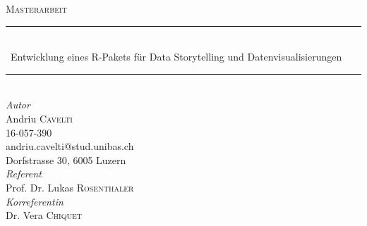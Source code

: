 


	\newcommand{\HRule}{\rule{\linewidth}{0.5mm}} %

	\begin{center}



	\textsc{\Large Masterarbeit}\\[1.5cm] %


	\HRule\\[0.4cm]

	{\huge\ Entwicklung eines R-Pakets für Data Storytelling und Datenvisualisierungen}\\[0.4cm] %

	\HRule\\[1.5cm]


	\large
	  \textit{Autor}\\
	  Andriu \textsc{Cavelti}\\
	  16-057-390\\
	  andriu.cavelti@stud.unibas.ch\\
	  Dorfstrasse 30, 6005 Luzern\\[1.5cm]

	  \textit{Referent}\\
	  Prof. Dr. Lukas \textsc{Rosenthaler}\\[0.5cm]
	  \textit{Korreferentin}\\
		Dr. Vera \textsc{Chiquet}\\[1.5cm]


\end{center}
